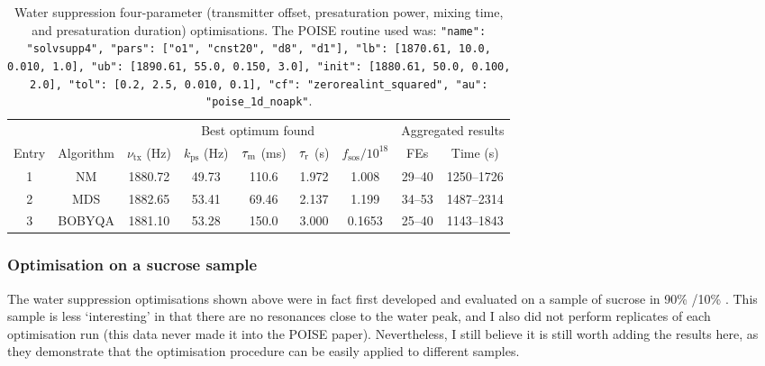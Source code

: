 \begin{table}
    \centering
    \begin{tabular}{ccccccccc}
        \toprule
              &           & \multicolumn{5}{c}{Best optimum found} & \multicolumn{2}{c}{Aggregated results} \\
                            \cmidrule(lr){3-7}                       \cmidrule(lr){8-9}
        Entry & Algorithm & $\nu_\text{tx}$ (\unit{\Hz}) & $k_\text{ps}$ (\unit{\Hz}) & $\tau_\mathrm{m}$ (\unit{\ms}) & $\tau_\mathrm{r}$ (\unit{\s}) & $f_\text{sos} / 10^{18}$ & FEs    & Time (\unit{\s}) \\
        \midrule
        1     & NM        & 1880.72                    & 49.73          & 110.6              & 1.972             & 1.008                    & 29--40 & 1250--1726     \\
        2     & MDS       & 1882.65                    & 53.41          & 69.46              & 2.137             & 1.199                    & 34--53 & 1487--2314     \\
        3     & BOBYQA    & 1881.10                    & 53.28          & 150.0              & 3.000             & 0.1653                   & 25--40 & 1143--1843     \\
        \bottomrule
    \end{tabular}
    \caption[Water suppression four-parameter optimisations]{
        Water suppression four-parameter (transmitter offset, presaturation power, mixing time, and presaturation duration) optimisations.
        The POISE routine used was: \texttt{{"name": "solvsupp4", "pars": ["o1", "cnst20", "d8", "d1"], "lb": [1870.61, 10.0, 0.010, 1.0], "ub": [1890.61, 55.0, 0.150, 3.0], "init": [1880.61, 50.0, 0.100, 2.0], "tol": [0.2, 2.5, 0.010, 0.1], "cf": "zerorealint_squared", "au": "poise_1d_noapk"}}.
    }
    \label{tbl:poise_solvsupp4p}
\end{table}




\subsubsection{Optimisation on a sucrose sample}

The water suppression optimisations shown above were in fact first developed and evaluated on a sample of sucrose in 90\% /10\% .
This sample is less `interesting' in that there are no resonances close to the water peak, and I also did not perform replicates of each optimisation run (this data never made it into the POISE paper).
Nevertheless, I still believe it is still worth adding the results here, as they demonstrate that the optimisation procedure can be easily applied to different samples.

